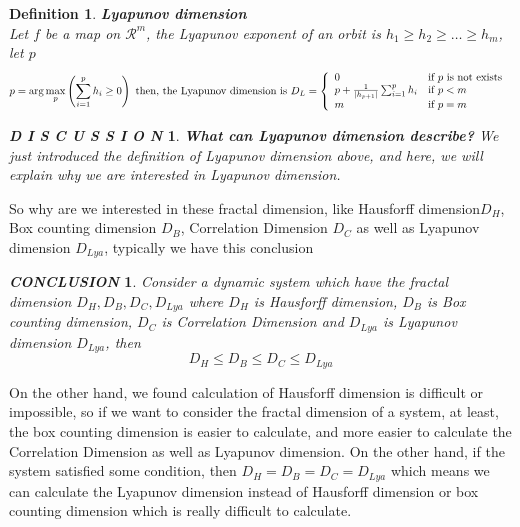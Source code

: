 \documentclass[12pt]{article}
\theoremstyle{plain}
\newtheorem{definition}{{\color{red}\textbf{Definition}}}[section]
\newtheorem{discussion}{\textit{D I S C U S S I O N}}[section]
\newtheorem{conclusion}{\textit{\textbf{CONCLUSION}}}[section]
\begin{document}
\begin{definition}\textbf{Lyapunov dimension}
\\\noindent Let $f$ be a map on $\mathcal R^m$, the Lyapunov exponent of an orbit is $h_1 \geq h_2 \geq \ldots \geq h_m$, let $p$
$$
p = \arg\max_{p} \left(\sum_{i = 1}^{p} h_i \geq 0\right) \text{ then, the Lyapunov dimension is } D_L = 
\left\{\begin{array}{ll}
0                                           & \text{if $p$ is not exists }\\
p + {1\over |h_{p+1}|} \sum_{i = 1}^{p} h_i & \text{if $p < m$}\\
m                                           & \text{if $p = m$}\\
\end{array}\right.
$$
\end{definition}
\begin{discussion}\textbf{What can Lyapunov dimension describe?}
We just introduced the definition of Lyapunov dimension above, and here, we will explain why we are interested in Lyapunov dimension.
\end{discussion}

So why are we interested in these fractal dimension, like Hausforff dimension$D_H$, Box counting dimension $D_B$, Correlation Dimension $D_C$ as well as Lyapunov dimension $D_{Lya}$, typically we have this conclusion 
\begin{conclusion} Consider a dynamic system which have the fractal dimension $D_H, D_B, D_C, D_{Lya}$ where $D_H$ is Hausforff dimension, $D_B$ is Box counting dimension, $D_C$ is Correlation Dimension and $D_{Lya}$ is Lyapunov dimension $D_{Lya}$, then 
$$
D_H \leq D_B \leq D_C \leq D_{Lya}
$$
\end{conclusion}

On the other hand, we found calculation of Hausforff dimension is difficult or impossible, so if we want to consider the fractal dimension of a system, at least, the box counting dimension is easier to calculate, and more easier to calculate the Correlation Dimension as well as Lyapunov dimension. On the other hand, if the system satisfied some condition, then $D_H = D_B = D_C = D_{Lya}$ which means we can calculate the Lyapunov dimension instead of Hausforff dimension or box counting dimension which is really difficult to calculate. 
\end{document}
